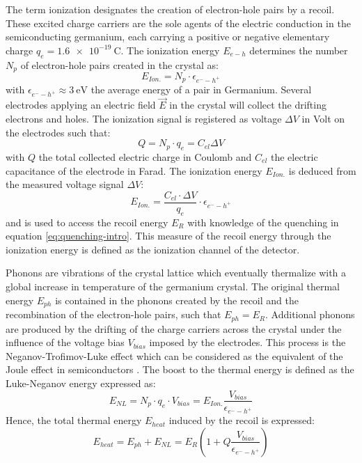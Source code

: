 The term ionization designates the creation of electron-hole pairs by a recoil. These excited charge carriers are the sole agents of the electric conduction in the semiconducting germanium, each carrying a positive or negative elementary charge $q_e = \SI{1.6e-19}{\coulomb}$.
The ionization energy $E_{e-h}$ determines the number $N_p$ of electron-hole pairs created in the crystal as:
\begin{equation}
E_{Ion.} = N_p \cdot \epsilon_{e^--h^+}
\end{equation}
with $\epsilon_{e^--h^+} \approx \SI{3}{\eV}$ the average energy of a pair in Germanium. 
Several electrodes applying an electric field $\vec{E}$ in the crystal will collect the drifting electrons and holes. The ionization signal is registered as voltage $\Delta V$ in Volt on the electrodes such that:
\begin{equation}
Q = N_p \cdot q_e = C_{el} \Delta V
\end{equation} 
with $Q$ the total collected electric charge in Coulomb and $C_{el}$ the electric capacitance of the electrode in Farad.
The ionization energy $E_{Ion.}$ is deduced from the measured voltage signal $\Delta V$:
\begin{equation}
E_{Ion.} = \frac{C_{el} \cdot \Delta V}{q_{e}} \cdot \epsilon_{e^--h^+}
\end{equation}
and is used to access the recoil energy $E_R$ with knowledge of the quenching in equation \ref{eq:quenching-intro}. This measure of the recoil energy through the ionization energy is defined as the ionization channel of the  detector.


Phonons are vibrations of the crystal lattice which eventually thermalize with a global increase in temperature of the germanium crystal. The original thermal energy $E_{ph}$ is contained in the phonons created by the recoil and the recombination of the electron-hole pairs, such that $E_{ph} = E_R$.
Additional phonons are produced by the drifting  of the charge carriers across the crystal under the influence of the voltage bias $V_{bias}$ imposed by the electrodes. This process is the Neganov-Trofimov-Luke effect which can be considered as the equivalent of the Joule effect in semiconductors \cite{Luke,Neganov:1985khw}.
The boost to the thermal energy is defined as the Luke-Neganov energy expressed as:
\begin{equation}
E_{NL} = N_p \cdot q_e \cdot V_{bias} = E_{Ion.} \frac{V_{bias}}{\epsilon_{e^--h^+}}
\end{equation}
Hence, the total thermal energy $E_{heat}$ induced by the recoil is expressed:
\begin{equation}
E_{heat} = E_{ph} + E_{NL} = E_R \left( 1 + Q \frac{V_{bias}}{\epsilon_{e^--h^+}} \right)
\end{equation}

